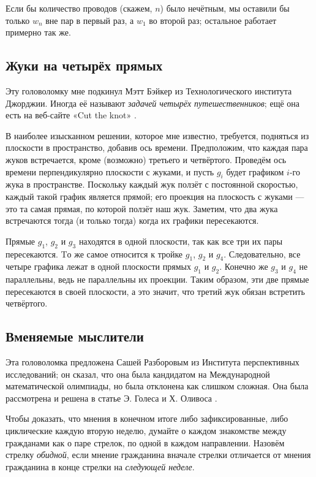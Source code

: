 Если бы количество проводов (скажем, $n$) было нечётным, мы оставили бы только $w_n$ вне пар в первый раз, а $w_1$ во второй раз; остальное работает примерно так же.

\subsection*{Жуки на четырёх прямых}

Эту головоломку мне подкинул Мэтт Бэйкер из Технологического института Джорджии.
Иногда её называют \emph{задачей четырёх путешественников};
ещё она есть на веб-сайте «Cut the knot» \cite{cut-the-knot}.

В наиболее изысканном решении, которое мне известно, требуется, подняться из плоскости в пространство, добавив ось времени.
Предположим, что каждая пара жуков встречается, кроме (возможно) третьего и четвёртого.
Проведём ось времени перпендикулярно плоскости с жуками, и пусть $g_i$ будет графиком $i$-го жука в пространстве.
Поскольку каждый жук ползёт с постоянной скоростью, каждый такой график является прямой;
его проекция на плоскость с жуками --- это та самая прямая, по которой ползёт наш жук.
Заметим, что два жука встречаются тогда (и только тогда) когда их графики пересекаются.

Прямые $g_1$, $g_2$ и $g_3$ находятся в одной плоскости, так как все три их пары пересекаются.
Tо же самое относится к тройке  $g_1$, $g_2$ и $g_4$.
Следовательно, все четыре графика лежат в одной плоскости прямых $g_1$ и $g_2$.
Конечно же $g_3$ и $g_4$ не параллельны, ведь не параллельны их проекции.
Таким образом, эти две прямые пересекаются в своей плоскости,
а это значит, что третий жук обязан встретить четвёртого.

\subsection*{Вменяемые мыслители}

Эта головоломка предложена Сашей Разборовым из Института перспективных исследований;
он сказал, что она была кандидатом на Международной математической олимпиады, но была отклонена как слишком сложная.
Она была рассмотрена и решена в статье Э. Голеса и Х. Оливоса \cite{goles-olivos}.

Чтобы доказать, что мнения в конечном итоге либо зафиксированные, либо циклические каждую вторую неделю, думайте о каждом знакомстве между гражданами как о паре стрелок, по одной в каждом направлении.
Назовём стрелку \emph{обидной}, если мнение гражданина вначале стрелки отличается от мнения гражданина в конце стрелки на \emph{следующей неделе}.

